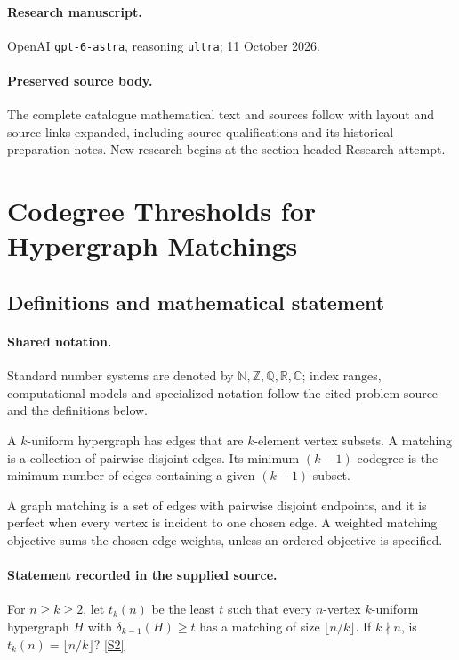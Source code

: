 \documentclass[11pt]{article}
\begin{document}
\paragraph{Research manuscript.} OpenAI \texttt{gpt-6-astra}, reasoning \texttt{ultra}; 11 October 2026.
\paragraph{Preserved source body.} The complete catalogue mathematical text and sources follow with layout and source links expanded, including source qualifications and its historical preparation notes. New research begins at the section headed Research attempt.

\section{Codegree Thresholds for Hypergraph Matchings}\label{statement}

\subsection{Definitions and mathematical statement}

\paragraph{Shared notation.}Standard number systems are denoted by $\mathbb N,\mathbb Z,\mathbb Q,\mathbb R,\mathbb C$; index ranges, computational models and specialized notation follow the cited problem source and the definitions below.


A $k$-uniform hypergraph has edges that are $k$-element vertex subsets. A matching is a collection of pairwise disjoint edges. Its minimum $(k-1)$-codegree is the minimum number of edges containing a given $(k-1)$-subset.

A graph matching is a set of edges with pairwise disjoint endpoints, and it is perfect when every vertex is incident to one chosen edge. A weighted matching objective sums the chosen edge weights, unless an ordered objective is specified.
\paragraph{Statement recorded in the supplied source.}
For $n\geq k\geq2$, let $t_k(n)$ be the least $t$ such that every $n$-vertex $k$-uniform hypergraph $H$ with $\delta_{k-1}(H)\geq t$ has a matching of size $\lfloor n/k\rfloor$. If $k\nmid n$, is $t_k(n)=\lfloor n/k\rfloor$? \href{https://doi.org/10.4171/owr/2006/48}{[S2]}
\end{document}
